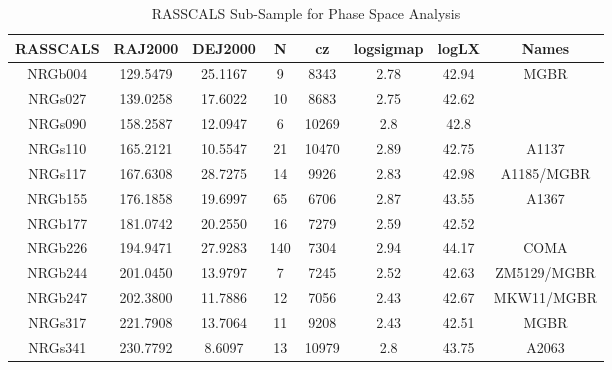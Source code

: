 \documentclass{article}
\begin{document}
\begin{table}
\caption{RASSCALS Sub-Sample for Phase Space Analysis}
\begin{tabular}{cccccccc}
\hline \hline
RASSCALS & RAJ2000 & DEJ2000 & N & cz & logsigmap & logLX & Names \\
\hline
NRGb004 & 129.5479 & 25.1167 & 9 & 8343 & 2.78 & 42.94 & MGBR \\
NRGs027 & 139.0258 & 17.6022 & 10 & 8683 & 2.75 & 42.62 &  \\
NRGs090 & 158.2587 & 12.0947 & 6 & 10269 & 2.8 & 42.8 &  \\
NRGs110 & 165.2121 & 10.5547 & 21 & 10470 & 2.89 & 42.75 & A1137 \\
NRGs117 & 167.6308 & 28.7275 & 14 & 9926 & 2.83 & 42.98 & A1185/MGBR \\
NRGb155 & 176.1858 & 19.6997 & 65 & 6706 & 2.87 & 43.55 & A1367 \\
NRGb177 & 181.0742 & 20.2550 & 16 & 7279 & 2.59 & 42.52 &  \\
NRGb226 & 194.9471 & 27.9283 & 140 & 7304 & 2.94 & 44.17 & COMA \\
NRGb244 & 201.0450 & 13.9797 & 7 & 7245 & 2.52 & 42.63 & ZM5129/MGBR \\
NRGb247 & 202.3800 & 11.7886 & 12 & 7056 & 2.43 & 42.67 & MKW11/MGBR \\
NRGs317 & 221.7908 & 13.7064 & 11 & 9208 & 2.43 & 42.51 & MGBR \\
NRGs341 & 230.7792 & 8.6097 & 13 & 10979 & 2.8 & 43.75 & A2063 \\
\hline
\end{tabular}
\end{table}
\end{document}
